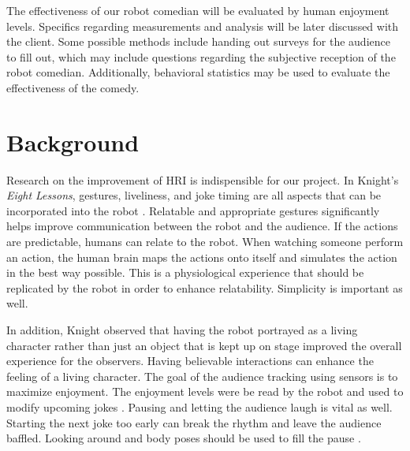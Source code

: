 \documentclass[onecolumn, draftclsnofoot,10pt, compsoc]{IEEEtran}
\begin{document}
The effectiveness of our robot comedian will be evaluated by human enjoyment levels. Specifics regarding measurements and analysis will be later discussed with the client. Some possible methods include handing out surveys for the audience to fill out, which may include questions regarding the subjective reception of the robot comedian. Additionally, behavioral statistics may be used to evaluate the effectiveness of the comedy.

\section{Background}

Research on the improvement of HRI is indispensible for our project. In Knight's \textit{Eight Lessons}, gestures, liveliness, and joke timing are all aspects that can be incorporated into the robot {\cite{KnightEightLessons:2011}}.
Relatable and appropriate gestures significantly helps improve communication between the robot and the audience. If the actions are predictable, humans can relate to the robot.
When watching someone perform an action, the human brain maps the actions onto itself and simulates the action in the best way possible. This is a physiological experience that should be replicated by the robot in order to enhance relatability. Simplicity is important as well. {\cite{KnightEightLessons:2011}}


In addition, Knight observed that having the robot portrayed as a living character rather than just an object that is kept up on stage improved the overall experience for the observers. Having believable interactions can enhance the feeling of a living character.
The goal of the audience tracking using sensors is to maximize enjoyment. The enjoyment levels were be read by the robot and used to modify upcoming jokes {\cite{KnightEightLessons:2011}}. Pausing and letting the audience laugh is vital as well. Starting the next joke too early can break the rhythm and leave the audience baffled. Looking around and body poses should be used to fill the pause {\cite{KnightEightLessons:2011}}.
\end{document}
